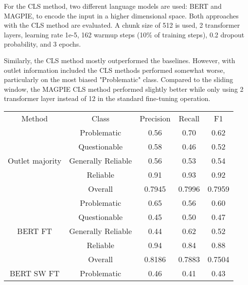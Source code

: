 For the CLS method, two different language models are used: BERT and MAGPIE, to encode the input in a higher dimensional space. Both approaches with the CLS method are evaluated. A chunk size of 512 is used, 2 transformer layers, learning rate 1e-5, 162 warmup steps (10\% of training steps), 0.2 dropout probability, and 3 epochs.


Similarly, the CLS method mostly outperformed the baselines. However, with outlet information included the CLS methods performed somewhat worse, particularly on the most biased "Problematic" class. Compared to the sliding window, the MAGPIE CLS method performed slightly better while only using 2 transformer layer instead of 12 in the standard fine-tuning operation.


\begin{table}[htbp]
    \centering
    \small
    \begin{tabular}{| c | c | c | c | c |}
        \hline                            Method & Class              & Precision & Recall & F1     \\\cline{1-5}
        \multirow{5}{*}{Outlet majority}         & Problematic        & 0.56      & 0.70   & 0.62   \\
                                                 & Questionable       & 0.58      & 0.46   & 0.52   \\
                                                 & Generally Reliable & 0.56      & 0.53   & 0.54   \\
                                                 & Reliable           & 0.91      & 0.93   & 0.92   \\
                                                 & Overall            & 0.7945    & 0.7996 & 0.7959 \\
        \hline
        \multirow{5}{*}{BERT FT}                 & Problematic        & 0.65      & 0.56   & 0.60   \\
                                                 & Questionable       & 0.45      & 0.50   & 0.47   \\
                                                 & Generally Reliable & 0.44      & 0.62   & 0.52   \\
                                                 & Reliable           & 0.94      & 0.84   & 0.88   \\
                                                 & Overall            & 0.8186    & 0.7883 & 0.7504 \\
        \hline
        \multirow{5}{*}{BERT SW FT}              & Problematic        & 0.46      & 0.41   & 0.43   \\

\end{tabular}
\end{table}
